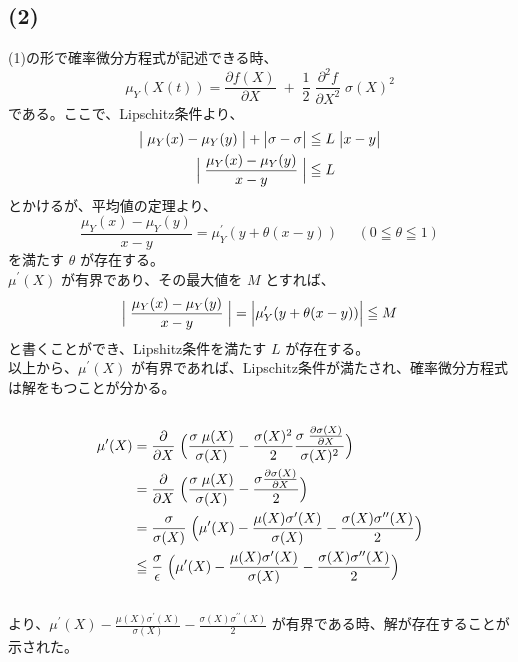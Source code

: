 \documentclass[a4j,10pt,oneside,openany]{jsbook}
\begin{document}
\subsection*{(2)}
(1)の形で確率微分方程式が記述できる時、
\[ \mu_{Y}(X(t)) = \frac{\partial f(X)}{\partial X} \; + \; \frac{1}{2} \; \frac{{\partial} ^{2} f}{{\partial} X^2} \; \sigma(X)^2 \]
である。ここで、Lipschitz条件より、
\begin{align*}
\bigl{|} \; \mu_{Y}(x) - \mu_{Y}(y) \; \bigr{|} + \bigl{|} \sigma - \sigma \bigr{|} &\leqq L \; \bigl{|} x - y \bigr{|} \\
\Bigl{|} \; \frac{ \mu_{Y}(x) - \mu_{Y}(y) }{ x - y } \; \Bigr{|} &\leqq L
\end{align*}
とかけるが、平均値の定理より、
\[ \frac{ \mu_{Y}(x) - \mu_{Y}(y) }{ x - y } = \mu^{\prime}_{Y}(y + \theta (x - y)) \;\;\;\;\; (0 \leqq \theta \leqq 1) \]
を満たす $\theta$ が存在する。\\
$\mu^{\prime}(X)$ が有界であり、その最大値を $M$ とすれば、
\[ \Bigl{|} \; \frac{ \mu_{Y}(x) - \mu_{Y}(y) }{ x - y } \; \Bigr{|} = \Bigl{|} \mu^{\prime}_{Y}(y + \theta (x - y)) \Bigr{|} \leqq M \]
と書くことができ、Lipshitz条件を満たす $L$ が存在する。\\
以上から、$\mu^{\prime}(X)$ が有界であれば、Lipschitz条件が満たされ、確率微分方程式は解をもつことが分かる。\\
\\
\begin{align*}
\mu^{\prime}(X)	&= \frac{\partial}{\partial X} \; \Bigl{(} \frac{\sigma \; \mu (X)}{\sigma (X)}
				- \frac{\sigma (X)^2}{2} \frac{\sigma \; \frac{\partial \sigma (X)}{\partial X}}{\sigma(X)^2} \Bigr{)} \\
				&= \frac{\partial}{\partial X} \; \Bigl{(} \frac{\sigma \; \mu (X)}{\sigma (X)}
				- \frac{\sigma \frac{\partial \sigma (X)}{\partial X} }{2} \Bigr{)} \\
				&= \frac{\sigma}{\sigma (X)} \; \Bigl{(} \mu ^{\prime}(X) - \frac{\mu (X) \sigma ^{\prime} (X)}{\sigma (X)}
				- \frac{\sigma (X) \sigma ^{\prime \prime}(X)}{2} \Bigr{)} \\
				&\leqq \frac{\sigma}{\epsilon} \; \Bigl{(} \mu ^{\prime}(X) - \frac{\mu (X) \sigma ^{\prime} (X)}{\sigma (X)}
				- \frac{\sigma (X) \sigma ^{\prime \prime}(X)}{2} \Bigr{)}
\end{align*}
\\
より、$\mu ^{\prime}(X) - \frac{\mu (X) \sigma ^{\prime} (X)}{\sigma (X)} - \frac{\sigma (X) \sigma ^{\prime \prime}(X)}{2}$
が有界である時、解が存在することが示された。
\vspace{2\baselineskip}
\end{document}
